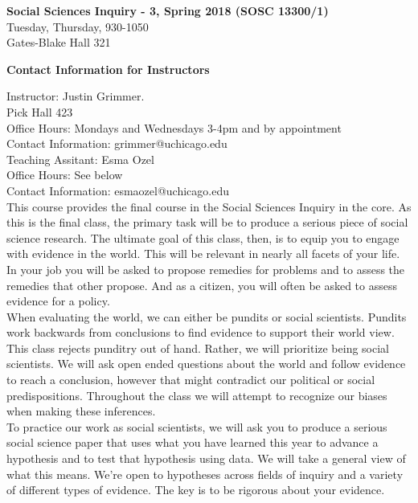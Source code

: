 \documentclass[12pt,letterpaper]{article}
\numberwithin{equation}{section}
\begin{document}
\begin{center}
\textbf{Social Sciences Inquiry - 3, Spring 2018 (SOSC 13300/1)}\\
Tuesday, Thursday, 930-1050 \\
Gates-Blake Hall 321
\end{center}


\noindent \textbf{Contact Information for Instructors}

\noindent Instructor: Justin Grimmer.\\
Pick Hall 423 \\
Office Hours: Mondays and Wednesdays 3-4pm and by appointment \\
Contact Information: grimmer@uchicago.edu \\

\noindent Teaching Assitant: Esma Ozel\\
Office Hours: See below\\
Contact Information: esmaozel@uchicago.edu\\

\noindent This course provides the final course in the Social Sciences Inquiry in the core.  As this is the final class, the primary task will be to produce a serious piece of social science research. The ultimate goal of this class, then, is to equip you to engage with evidence in the world.  This will be relevant in nearly all facets of your life.  In your job you will be asked to propose remedies for problems and to assess the remedies that other propose. And as a citizen, you will often be asked to assess evidence for a policy.   \\

\noindent When evaluating the world, we can either be pundits or social scientists.  Pundits work backwards from conclusions to find evidence to support their world view.  This class rejects punditry out of hand.  Rather, we will prioritize being social scientists.  We will ask open ended questions about the world and follow evidence to reach a conclusion, however that might contradict our political or social predispositions.  Throughout the class we will attempt to recognize our biases when making these inferences.  \\

\noindent To practice our work as social scientists, we will ask you to produce a serious social science paper that uses what you have learned this year to advance a hypothesis and to test that hypothesis using data.  We will take a general view of what this means. We're open to hypotheses across fields of inquiry and a variety of different types of evidence.  The key is to be rigorous about your evidence.    \\
\end{document}
